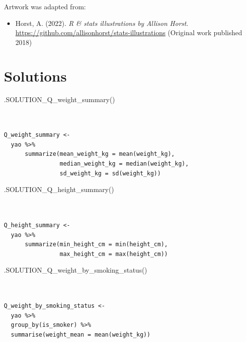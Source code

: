 \documentclass[
  letterpaper,
  DIV=11,
  numbers=noendperiod]{scrreprt}
\newenvironment{Shaded}{\begin{snugshade}}{\end{snugshade}}
\newcommand{\FunctionTok}[1]{\textcolor[rgb]{0.28,0.35,0.67}{#1}}
\newcommand{\NormalTok}[1]{\textcolor[rgb]{0.00,0.23,0.31}{#1}}
\providecommand{\tightlist}{%
  \setlength{\itemsep}{0pt}\setlength{\parskip}{0pt}}\usepackage{longtable,booktabs,array}
\begin{document}
Artwork was adapted from:

\begin{itemize}
\tightlist
\item
  Horst, A. (2022). \emph{R \& stats illustrations by Allison Horst}.
  \url{https://github.com/allisonhorst/stats-illustrations} (Original
  work published 2018)
\end{itemize}

\section{Solutions}\label{solutions-5}

\begin{Shaded}
\begin{Highlighting}[]
\FunctionTok{.SOLUTION\_Q\_weight\_summary}\NormalTok{()}
\end{Highlighting}
\end{Shaded}

\begin{verbatim}


Q_weight_summary <- 
  yao %>%
      summarize(mean_weight_kg = mean(weight_kg),
                median_weight_kg = median(weight_kg),
                sd_weight_kg = sd(weight_kg))
\end{verbatim}

\begin{Shaded}
\begin{Highlighting}[]
\FunctionTok{.SOLUTION\_Q\_height\_summary}\NormalTok{()}
\end{Highlighting}
\end{Shaded}

\begin{verbatim}


Q_height_summary <- 
  yao %>%
      summarize(min_height_cm = min(height_cm),
                max_height_cm = max(height_cm))
\end{verbatim}

\begin{Shaded}
\begin{Highlighting}[]
\FunctionTok{.SOLUTION\_Q\_weight\_by\_smoking\_status}\NormalTok{()}
\end{Highlighting}
\end{Shaded}

\begin{verbatim}


Q_weight_by_smoking_status <- 
  yao %>% 
  group_by(is_smoker) %>% 
  summarise(weight_mean = mean(weight_kg))
\end{verbatim}
\end{document}
